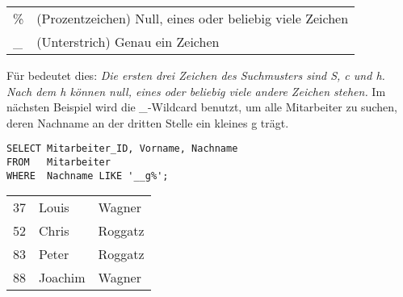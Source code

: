           \begin{center}
            \label{likewildcards}
            \begin{small}
              \tabletail{
                \hline
              }
              \tablelasttail{
                \hline
              }
              \begin{supertabular}{lp{10cm}}
                \% & (Prozentzeichen) Null, eines oder beliebig viele Zeichen \\
                \_ & (Unterstrich) Genau ein Zeichen \\
              \end{supertabular}
            \end{small}
          \end{center}
          F\"ur  bedeutet dies: \textit{Die ersten drei Zeichen des Suchmusters sind S, c und h. Nach dem h k\"onnen null, eines oder beliebig viele andere Zeichen stehen.} Im n\"achsten Beispiel wird die \textit{\_}-Wildcard benutzt, um alle Mitarbeiter zu suchen, deren Nachname an der dritten Stelle ein kleines g tr\"agt.
          \begin{lstlisting}[language=oracle_sql,caption={Zeichenkettensuche mit einem etwas komplexeren Suchmuster},label=sql02_09]
SELECT Mitarbeiter_ID, Vorname, Nachname
FROM   Mitarbeiter
WHERE  Nachname LIKE '__g%';
          \end{lstlisting}
\clearpage
          \begin{center}
            \begin{small}
              \tablehead{}
              \begin{msoraclesql}
                \begin{supertabular}{rll}
                37 & Louis & Wagner \\
                52 & Chris & Roggatz \\
                83 & Peter & Roggatz \\
                88 & Joachim & Wagner \\
                \end{supertabular}
              \end{msoraclesql}
            \end{small}
          \end{center}
